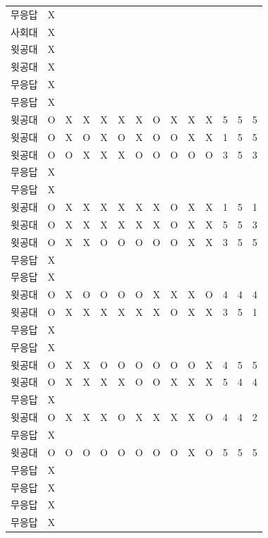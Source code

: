 \documentclass[11pt,a4paper]{article}
\begin{document}
\begin{center}
\begin{tabular}{ | p{2cm} | c | c | c | c | c | c | c | c | c | c | c | c | c | }
무응답 & X & & & & & & & & & & & & \\
사회대 & X & & & & & & & & & & & & \\
윗공대 & X & & & & & & & & & & & & \\
윗공대 & X & & & & & & & & & & & & \\
무응답 & X & & & & & & & & & & & & \\
무응답 & X & & & & & & & & & & & & \\
윗공대 & O & X & X & X & X & X & O & X & X & X & 5 & 5 & 5 \\
윗공대 & O & X & O & X & O & X & O & O & X & X & 1 & 5 & 5 \\
윗공대 & O & O & X & X & X & O & O & O & O & O & 3 & 5 & 3 \\
무응답 & X & & & & & & & & & & & & \\
무응답 & X & & & & & & & & & & & & \\
윗공대 & O & X & X & X & X & X & X & O & X & X & 1 & 5 & 1 \\
윗공대 & O & X & X & X & X & X & X & O & X & X & 5 & 5 & 3 \\
윗공대 & O & X & X & O & O & O & O & O & X & X & 3 & 5 & 5 \\
무응답 & X & & & & & & & & & & & & \\
무응답 & X & & & & & & & & & & & & \\
윗공대 & O & X & O & O & O & O & X & X & X & O & 4 & 4 & 4 \\
윗공대 & O & X & X & X & X & X & X & O & X & X & 3 & 5 & 1 \\
무응답 & X & & & & & & & & & & & & \\
무응답 & X & & & & & & & & & & & & \\
윗공대 & O & X & X & O & O & O & O & O & O & X & 4 & 5 & 5 \\
윗공대 & O & X & X & X & X & O & O & X & X & X & 5 & 4 & 4 \\
무응답 & X & & & & & & & & & & & & \\
윗공대 & O & X & X & X & O & X & X & X & X & O & 4 & 4 & 2 \\
무응답 & X & & & & & & & & & & & & \\
윗공대 & O & O & O & O & O & O & O & O & X & O & 5 & 5 & 5 \\
무응답 & X & & & & & & & & & & & & \\
무응답 & X & & & & & & & & & & & & \\
무응답 & X & & & & & & & & & & & & \\
무응답 & X & & & & & & & & & & & & \\

\end{tabular}
\end{center}
\end{document}
